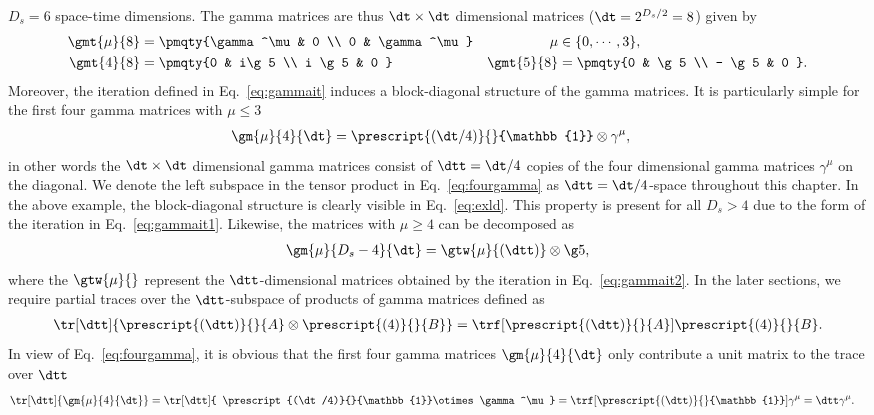 $D_s=6$ space-time dimensions. The gamma matrices are thus $\dt\times
\dt$ dimensional matrices ($\dt=2^{D_s/2}=8$) given by
\begin{subequations}
\begin{align}
  \gmt{\mu}{8} &= \pmqty{\gamma^\mu & 0 \\ 0 & \gamma^\mu}
  &\mu&\in\{0,\cdots,3\},\label{eq:exld}\\
 \gmt{4}{8} &= \pmqty{0 & i\g5 \\ i \g5 & 0 }   & \gmt{5}{8} &= \pmqty{0 & \g5 \\ - \g5 & 0 }. 
\end{align}
\end{subequations}
Moreover, the iteration defined in Eq.~\eqref{eq:gammait} induces a block-diagonal
structure of the gamma matrices. It is particularly simple for the
first four gamma matrices with $\mu \leq 3$
\begin{align}\label{eq:fourgamma}
\gm{\mu}{4}{\dt} &= \prescript{(\dt/4)}{}{\mathbb{1}}\otimes \gamma^\mu,
\end{align}
in other words the $\dt\times \dt$ dimensional gamma matrices consist of $\dtt=\dt/4$ copies
of the four dimensional gamma matrices $\gamma^\mu$ on the
diagonal. We denote the left
subspace in the tensor product in Eq.~\eqref{eq:fourgamma} as $\dtt =
\dt/4$-space throughout this chapter. In the above example, the block-diagonal structure is clearly visible in
Eq.~\eqref{eq:exld}. This property is present for all $D_s>4$ due to
the form of the iteration in Eq.~\eqref{eq:gammait1}. Likewise, the matrices
with $\mu \geq 4$ can be decomposed as 
\begin{align}\label{eq:highgamma}
\gm{\mu}{D_s-4}{\dt}  =  \gtw{\mu}{(\dtt)}\otimes  {\g5},
\end{align}
where the $\gtw{\mu}{}$ represent the $\dtt$-dimensional
matrices obtained by the iteration in Eq.~\eqref{eq:gammait2}. In the later sections, we require partial traces over the
$\dtt$-subspace of products of gamma matrices defined as 
\begin{align}
  \tr[\dtt]{\prescript{(\dtt)}{}{A}\otimes\prescript{(4)}{}{B}} = \trf[{\prescript{(\dtt)}{}{A}}]\prescript{(4)}{}{B}.
\end{align}
In view of Eq.~\eqref{eq:fourgamma}, it is obvious that the first
four gamma matrices $\gm{\mu}{4}{\dt}$ only contribute a unit
matrix to the trace over $\dtt$
\begin{align}
 \tr[\dtt]{ \gm{\mu}{4}{\dt}} &=\tr[\dtt]{
   \prescript{(\dt/4)}{}{\mathbb{1}}\otimes \gamma^\mu} =
 \trf[{\prescript{(\dtt)}{}{\mathbb{1}}}] \gamma^\mu = \dtt \gamma^\mu.
\end{align}
